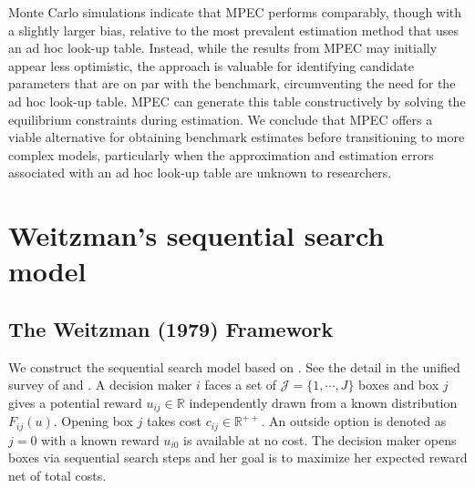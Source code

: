 \documentclass[12pt]{article}
\begin{document}
Monte Carlo simulations indicate that MPEC performs comparably, though with a slightly larger bias, relative to the most prevalent estimation method that uses an ad hoc look-up table. Instead, while the results from MPEC may initially appear less optimistic, the approach is valuable for identifying candidate parameters that are on par with the benchmark, circumventing the need for the ad hoc look-up table. MPEC can generate this table constructively by solving the equilibrium constraints during estimation. We conclude that MPEC offers a viable alternative for obtaining benchmark estimates before transitioning to more complex models, particularly when the approximation and estimation errors associated with an ad hoc look-up table are unknown to researchers.




\section{Weitzman's sequential search model}

\subsection{The Weitzman (1979) Framework}
We construct the sequential search model based on \cite{weitzman1979optimal}.
See the detail in the unified survey of \cite{ursu2023sequential} and \cite{honka2019empirical}. 
A decision maker $i$ faces a set of $\mathcal{J}=\{1,\cdots,J\}$ boxes and box $j$ gives a potential reward $u_{ij}\in \mathbb{R}$ independently drawn from a known
distribution $F_{ij}(u)$.
Opening box $j$ takes cost $c_{ij}\in \mathbb{R}^{++}$. 
An outside option is denoted as $j = 0$ with a known reward $u_{i0}$ is available at no cost.
The decision maker
opens boxes via sequential search steps and her goal is to maximize her expected reward net of total costs.
\end{document}
